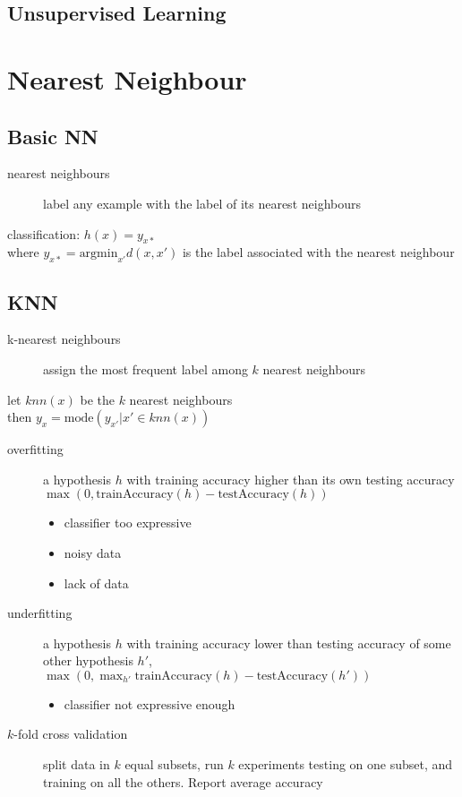 \documentclass[]{article}
\theoremstyle{definition}
\begin{document}
	\subsection{Unsupervised Learning}

	\section{Nearest Neighbour}

	\subsection{Basic NN}
	\begin{description}
		\item[nearest neighbours] label any example with the label of its nearest neighbours
	\end{description}
	classification: $h(x) = y_{x*}$  \\
	where $y_{x*} = \text{argmin}_{x'} d(x, x')$ is the label associated with the nearest neighbour

	\subsection{KNN}
	\begin{description}
		\item[k-nearest neighbours] assign the most frequent label among $k$ nearest neighbours
	\end{description}
	let $knn(x)$ be the $k$ nearest neighbours \\
	then $y_x = \text{mode}({y_{x'}|x' \in knn(x)})$

	\begin{description}
		\item[overfitting] a hypothesis $h$ with training accuracy higher than its own testing accuracy $\max (0, \text{trainAccuracy}(h) - \text{testAccuracy}(h))$
			\begin{itemize}
				\item classifier too expressive
				\item noisy data
				\item lack of data
			\end{itemize}
		\item[underfitting] a hypothesis $h$ with training accuracy lower than testing accuracy of some other hypothesis $h'$, 
			$\max (0, \max_{h'} \text{trainAccuracy}(h) - \text{testAccuracy}(h'))$
            \begin{itemize}
                \item classifier not expressive enough
            \end{itemize}
        \item[$k$-fold cross validation] split data in $k$ equal subsets, run $k$ experiments testing on one subset, and training on all the others. Report average accuracy
	\end{description}
\end{document}
